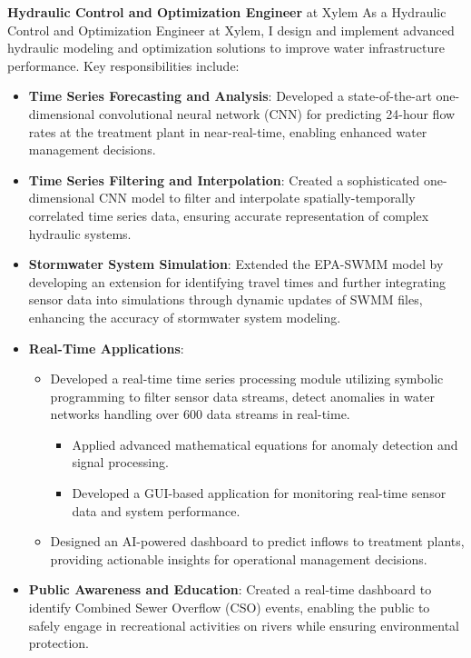\documentclass[a4paper,11pt]{article}
\newcommand{\years}[1]{%
  {\reversemarginpar\strut\marginnote{{\small#1}}}%
}
\begin{document}
\years{2020--2023}
\textbf{Hydraulic Control and Optimization Engineer} at Xylem
As a Hydraulic Control and Optimization Engineer at Xylem, I design and implement advanced hydraulic modeling and optimization solutions to improve water
infrastructure performance. Key responsibilities include:
\begin{itemize}
    \item
    \textbf{Time Series Forecasting and Analysis}:
    Developed a state-of-the-art one-dimensional convolutional neural network (CNN) for predicting 24-hour flow rates at the treatment plant in near-real-time,
enabling enhanced water management decisions.
    \item
    \textbf{Time Series Filtering and Interpolation}:
    Created a sophisticated one-dimensional CNN model to filter and interpolate spatially-temporally correlated time series data, ensuring accurate
representation of complex hydraulic systems.
    \item
    \textbf{Stormwater System Simulation}:
    Extended the EPA-SWMM model by developing an extension for identifying travel times and further integrating sensor data into simulations through dynamic
updates of SWMM files, enhancing the accuracy of stormwater system modeling.
    \item
    \textbf{Real-Time Applications}:
        \begin{itemize}
            \item Developed a real-time time series processing module utilizing symbolic programming to filter sensor data streams, detect anomalies in water
networks handling over 600 data streams in real-time.
                \begin{itemize}
                    \item Applied advanced mathematical equations for anomaly detection and signal processing.
                    \item Developed a GUI-based application for monitoring real-time sensor data and system performance.
                \end{itemize}
            \item Designed an AI-powered dashboard to predict inflows to treatment plants, providing actionable insights for operational management decisions.
        \end{itemize}
    \item
    \textbf{Public Awareness and Education}:
    Created a real-time dashboard to identify Combined Sewer Overflow (CSO) events, enabling the public to safely engage in recreational activities on rivers
while ensuring environmental protection.
\end{itemize}
\end{document}
